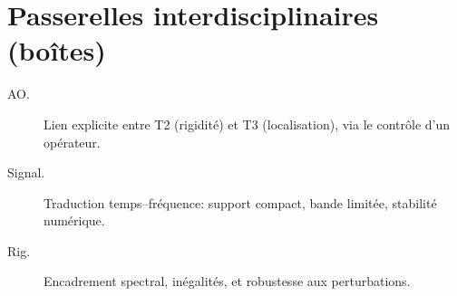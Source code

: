\section*{Passerelles interdisciplinaires (boîtes)}
\begin{description}
\item[AO.] Lien explicite entre T2 (rigidité) et T3 (localisation), via le contrôle d’un opérateur.
\item[Signal.] Traduction temps–fréquence: support compact, bande limitée, stabilité numérique.
\item[Rig.] Encadrement spectral, inégalités, et robustesse aux perturbations.
\end{description}
